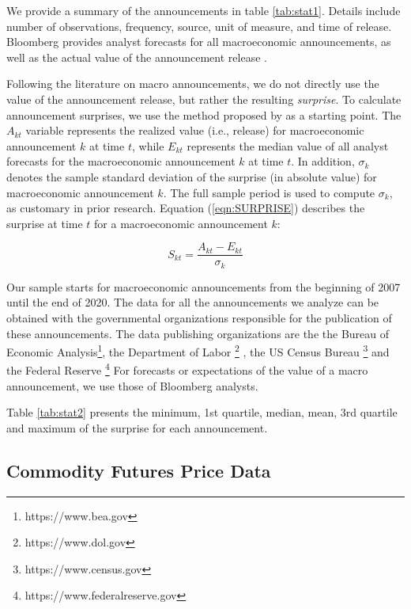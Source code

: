 \documentclass[12pt]{article}
\begin{document}
We provide a summary of the announcements in table \ref{tab:stat1}. Details include number of observations, frequency, source, unit of measure, and time of release. Bloomberg provides analyst forecasts for all macroeconomic announcements, as well as the actual value of the announcement release \citep[see e.g.,][]{kurov2019price}. 

Following the literature on macro announcements, we do not directly use the value of the announcement release, but rather the resulting \emph{surprise}. To calculate announcement surprises, we use the method proposed by \citet{balduzzi2001economic} as a starting point. The  $A_{kt}$ variable represents the realized value (i.e., release) for macroeconomic announcement $k$ at time $t$, while $E_{kt}$ represents the median value of all analyst forecasts for the macroeconomic announcement $k$ at time $t$. In addition, $\sigma_k$ denotes the sample standard deviation of the surprise (in absolute value) for macroeconomic announcement $k$. The full sample period is used to compute $\sigma_k$, as customary in prior research. Equation (\ref{eqn:SURPRISE}) describes the surprise at time $t$ for a macroeconomic announcement $k$:

\begin{equation}\label{eqn:SURPRISE}
S_{kt}=\frac{A_{kt}-E_{kt}}{\sigma_k}
\end{equation}

Our sample starts for macroeconomic announcements from the beginning of 2007 until the end of 2020. The data for all the announcements we analyze can be obtained with the governmental organizations responsible for the publication of these announcements. The data publishing organizations are the the Bureau of Economic Analysis\footnote{https://www.bea.gov}, the Department of Labor \footnote{https://www.dol.gov} , the US Census Bureau \footnote{https://www.census.gov}  and the  Federal Reserve \footnote{https://www.federalreserve.gov}
For forecasts or expectations of the value of a macro announcement, we use those of Bloomberg analysts. 

Table \ref{tab:stat2} presents the minimum, 1st quartile, median, mean, 3rd quartile and maximum of the surprise for each announcement. 
\subsection{Commodity Futures Price Data}
\end{document}
